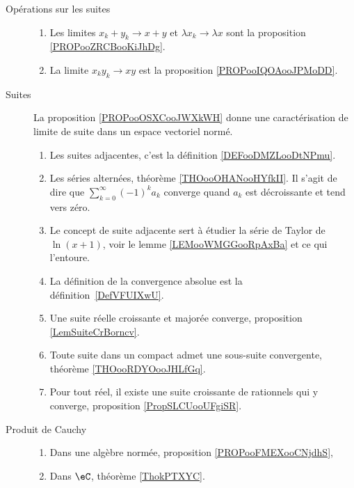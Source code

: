 	\label{THEMEooSuitesSeries}

\begin{description}
	\item[Opérations sur les suites]
	      \begin{enumerate}
		      \item
		            Les limites \( x_k+y_k\to x+y\) et \( \lambda x_k\to \lambda x\) sont la proposition \ref{PROPooZRCBooKiJhDg}.
		      \item
		            La limite \( x_ky_k\to xy\) est la proposition \ref{PROPooIQOAooJPMoDD}.
	      \end{enumerate}
	\item[Suites]
	      La proposition \ref{PROPooOSXCooJWXkWH} donne une caractérisation de limite de suite dans un espace vectoriel normé.
	      \begin{enumerate}
		      \item
		            Les suites adjacentes, c'est la définition \ref{DEFooDMZLooDtNPmu}.
		      \item
		            Les séries alternées, théorème \ref{THOooOHANooHYfkII}. Il s'agit de dire que \( \sum_{k=0}^{\infty}(-1)^ka_k\) converge quand \( a_k\) est décroissante et tend vers zéro.
		      \item
		            Le concept de suite adjacente sert à étudier la série de Taylor de \( \ln(x+1)\), voir le lemme \ref{LEMooWMGGooRpAxBa} et ce qui l'entoure.
		      \item
		            La définition de la convergence absolue est la définition~\ref{DefVFUIXwU}.
		      \item
		            Une suite réelle croissante et majorée converge, proposition \ref{LemSuiteCrBorncv}.
		      \item
		            Toute suite dans un compact admet une sous-suite convergente, théorème \ref{THOooRDYOooJHLfGq}.
		      \item
		            Pour tout réel, il existe une suite croissante de rationnels qui y converge, proposition \ref{PropSLCUooUFgiSR}.
	      \end{enumerate}
	\item[Produit de Cauchy]
	      \begin{enumerate}
		      \item
		            Dans une algèbre normée, proposition \ref{PROPooFMEXooCNjdhS},
		      \item
		            Dans \( \eC\), théorème \ref{ThokPTXYC}.
	      \end{enumerate}

\end{description}
